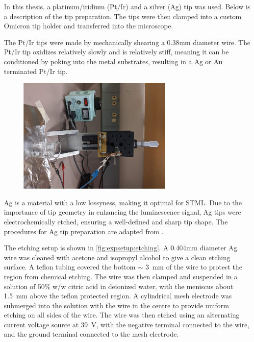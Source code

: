 In this thesis, a platinum/iridium (Pt/Ir) and a silver (Ag) tip was used. Below is a description of the tip preparation. The tips were then clamped into a custom Omicron tip holder and transferred into the microscope. 

The Pt/Ir tips were made by mechanically shearing a 0.38mm diameter wire. The Pt/Ir tip oxidizes relatively slowly and is relatively stiff, meaning it can be conditioned by poking into the metal substrates, resulting in a Ag or Au terminated Pt/Ir tip. 

\begin{figure} [h]
    \centering
    \includegraphics[width=3in,angle=-90]{pictures/etching.jpg}
    \caption{}
    \label{fig:expsetup:etching}
\end{figure}

Ag is a material with a low lossyness, making it optimal for \ac{STML}. Due to the importance of tip geometry in enhancing the luminescence signal, Ag tips were electrochemically etched, ensuring a well-defined and sharp tip shape. The procedures for Ag tip preparation are adapted from \citep{roussy2016coupling, zhang2011fabrication}. 

The etching setup is shown in \autoref{fig:expsetup:etching}. A 0.404mm diameter Ag wire was cleaned with acetone and isopropyl alcohol to give a clean etching surface. A teflon tubing covered the bottom $\sim$ \SI{3}{mm} of the wire to protect the region from chemical etching. The wire was then clamped and suspended in a solution of 50\% w/w citric acid in deionized water, with the meniscus about \SI{1.5}{mm} above the teflon protected region. A cylindrical mesh electrode was submerged into the solution with the wire in the centre to provide uniform etching on all sides of the wire. The wire was then etched using an alternating current voltage source at \SI{39}{V}, with the negative terminal connected to the wire, and the ground terminal connected to the mesh electrode. 

